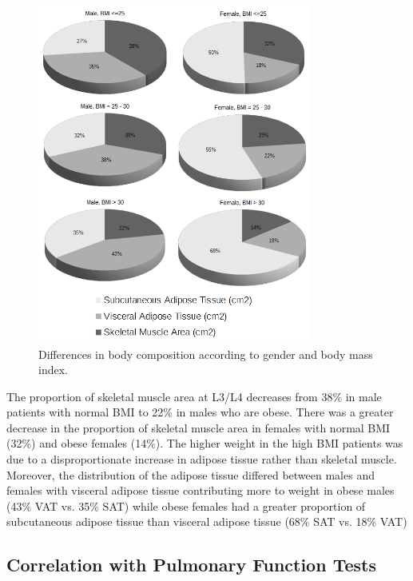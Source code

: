 \begin{figure}[h]
	\centering
	\includegraphics[width=0.8\textwidth]{Figures/bc_gender_bmi_pie}
	\caption{Differences in body composition according to gender and body mass index.}
	\label{fig:bc_gender_bmi}
\end{figure}

The proportion of skeletal muscle area at L3/L4 decreases from 38\% in male patients with normal BMI to 22\% in males who are obese. There was a greater decrease in the proportion of skeletal muscle area in females with normal BMI (32\%) and obese females (14\%). The higher weight in the high BMI patients was due to a disproportionate increase in adipose tissue rather than skeletal muscle. Moreover, the distribution of the adipose tissue differed between males and females with visceral adipose tissue contributing more to weight in obese males (43\% VAT vs. 35\% SAT) while obese females had a greater proportion of subcutaneous adipose tissue than visceral adipose tissue (68\% SAT vs. 18\% VAT)

\subsection{Correlation with Pulmonary Function Tests}

